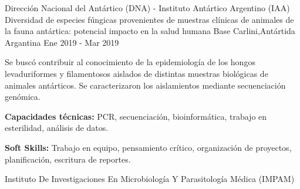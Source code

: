 \begin{cventries}
  \cventry
    {Dirección Nacional del Antártico (DNA) - Instituto Antártico Argentino (IAA)} %
    {Diversidad de especies fúngicas provenientes de muestras clínicas de animales de la fauna antártica: potencial impacto en la salud humana} %
    {Base Carlini,\newline Antártida Argantina} %
    {Ene 2019 - Mar 2019} %
    {
      \begin{cvitems} %
        \item {Se buscó contribuir al conocimiento de la epidemiología de los hongos levaduriformes y filamentosos aislados de distintas muestras biológicas de animales antárticos. Se caracterizaron los aislamientos mediante secuenciación genómica.}
        \item {\textbf{Capacidades técnicas:} PCR, secuenciación, bioinformática, trabajo en esterilidad, análisis de datos.}
        \item {\textbf{Soft Skills:} Trabajo en equipo, pensamiento crítico, organización de proyectos, planificación, escritura de reportes.}
      \end{cvitems}
    }
  \cventry
    {Instituto De Investigaciones En Microbiología Y Parasitología Médica (IMPAM)} %

\end{cventries}
